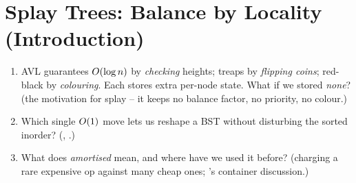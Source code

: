\section{Splay Trees: Balance by Locality (Introduction)}\label{sec:c06-splay}

\begin{previouslybox}
\begin{enumerate}[nosep, leftmargin=1.6em]
  \item AVL guarantees $O(\log n)$ by \emph{checking} heights; treaps by \emph{flipping coins};
        red-black by \emph{colouring}. Each stores extra per-node state. What if we stored \emph{none}?
        (the motivation for splay -- it keeps no balance factor, no priority, no colour.)
  \item Which single $O(1)$ move lets us reshape a BST without disturbing the sorted inorder?
        (, .)
  \item What does \emph{amortised} mean, and where have we used it before? (charging a rare expensive op
        against many cheap ones; 's container discussion.)
\end{enumerate}
\end{previouslybox}

